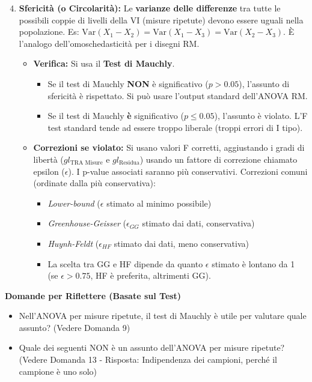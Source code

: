 \documentclass[12pt, a4paper]{article}
\newenvironment{reflectionbox}{%
    \medskip
    \begin{framed}\par\noindent
    \textbf{\color{boxtitlecolor}Domande per Riflettere (Basate sul Test)} \par
    \begin{itemize}[leftmargin=*, label=$\blacktriangleright$]
}{%
    \end{itemize}\par
    \end{framed}
    \medskip
}
\newcommand{\df}{gl} %
\begin{document}
\begin{enumerate}
    \setcounter{enumi}{3}
    \item \textbf{Sfericità (o Circolarità):} Le \textbf{varianze delle differenze} tra tutte le possibili coppie di livelli della VI (misure ripetute) devono essere uguali nella popolazione. Es: $\text{Var}(X_1-X_2) = \text{Var}(X_1-X_3) = \text{Var}(X_2-X_3)$. È l'analogo dell'omoschedasticità per i disegni RM.
        \begin{itemize}
            \item \textbf{Verifica:} Si usa il \textbf{Test di Mauchly}.
            \begin{itemize}
                \item Se il test di Mauchly \textbf{NON} è significativo ($p > 0.05$), l'assunto di sfericità è rispettato. Si può usare l'output standard dell'ANOVA RM.
                \item Se il test di Mauchly \textbf{è} significativo ($p \le 0.05$), l'assunto è violato. L'F test standard tende ad essere troppo liberale (troppi errori di I tipo).
            \end{itemize}
            \item \textbf{Correzioni se violato:} Si usano valori F corretti, aggiustando i gradi di libertà ($\df_{\text{TRA Misure}}$ e $\df_{\text{Residua}}$) usando un fattore di correzione chiamato epsilon ($\epsilon$). I p-value associati saranno più conservativi. Correzioni comuni (ordinate dalla più conservativa):
            \begin{itemize}
                \item \textit{Lower-bound} ($\epsilon$ stimato al minimo possibile)
                \item \textit{Greenhouse-Geisser} ($\epsilon_{GG}$ stimato dai dati, conservativa)
                \item \textit{Huynh-Feldt} ($\epsilon_{HF}$ stimato dai dati, meno conservativa)
                \item La scelta tra GG e HF dipende da quanto $\epsilon$ stimato è lontano da 1 (se $\epsilon > 0.75$, HF è preferita, altrimenti GG).
            \end{itemize}
        \end{itemize}
\end{enumerate}

\begin{reflectionbox}
    \item Nell'ANOVA per misure ripetute, il test di Mauchly è utile per valutare quale assunto? (Vedere Domanda 9)
    \item Quale dei seguenti NON è un assunto dell'ANOVA per misure ripetute? (Vedere Domanda 13 - Risposta: Indipendenza dei campioni, perché il campione è uno solo)
\end{reflectionbox}
\end{document}

